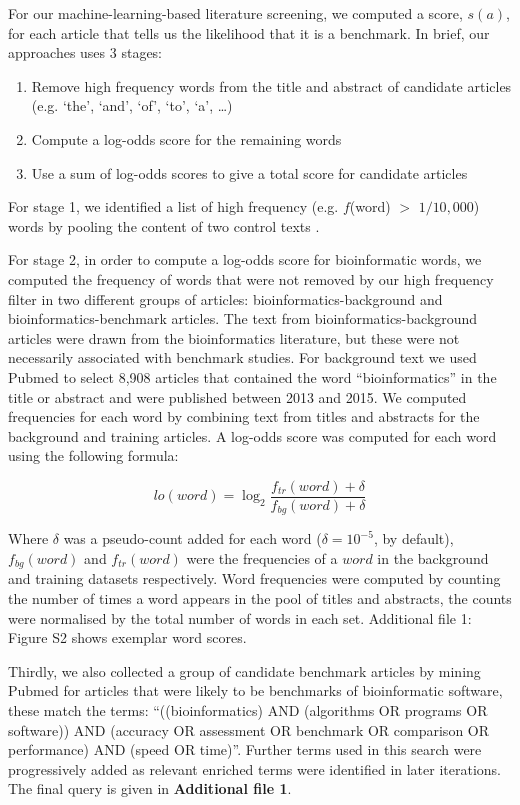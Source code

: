 \documentclass{bmcart}
\begin{document}
For our machine-learning-based literature screening, we computed a
score, $s(a)$, for each article that tells us the likelihood that it
is a benchmark. In brief, our approaches uses 3 stages:
\begin{enumerate}
\item Remove high frequency words from the title and abstract of candidate articles (e.g. ‘the’, ‘and’, ‘of’, ‘to’, ‘a’, …) 
\item Compute a log-odds score for the remaining words 
\item Use a sum of log-odds scores to give a total score for candidate articles
\end{enumerate}
For stage 1, we identified a list of high frequency (e.g. $f$(word) $>$
$1/10,000$) words by pooling the content of two control texts
\cite{Carroll1865-hk,Tolkien1937-ke}.

For stage 2, in order to compute a log-odds score for bioinformatic
words, we computed the frequency of words that were not removed by our
high frequency filter in two different groups of articles:
bioinformatics-background and bioinformatics-benchmark articles. The
text from bioinformatics-background articles were drawn from the
bioinformatics literature, but these were not necessarily associated
with benchmark studies. For background text we used Pubmed
\cite{Sayers2010-vm,McEntyre2001-fl} to select 8,908 articles that
contained the word “bioinformatics” in the title or abstract and were
published between 2013 and 2015. We computed frequencies for each word
by combining text from titles and abstracts for the background and
training articles. A log-odds score was computed for each word using
the following formula:

\[lo(word)=\log_2\frac{f_{tr}(word)+\delta}{f_{bg}(word)+\delta}\] 

Where
$\delta$
was a pseudo-count added for each word ($\delta = 10^{-5}$, by default),
$f_{bg}(word)$ and $f_{tr}(word)$ were the frequencies of a $word$ in
the background and training datasets respectively. Word frequencies
were computed by counting the number of times a word appears in the
pool of titles and abstracts, the counts were normalised by the total
number of words in each set. {\color{red}Additional file 1: Figure S2 shows exemplar word scores. }

Thirdly, we also collected a group of candidate benchmark articles by
mining Pubmed for articles that were likely to be benchmarks of
bioinformatic software, these match the terms: “((bioinformatics)
AND (algorithms OR programs OR software)) AND (accuracy OR assessment
OR benchmark OR comparison OR performance) AND (speed OR
time)”. Further terms used in this search were progressively added as
relevant enriched terms were identified in later iterations. The final
query is given in {\color{red} \textbf{Additional file 1}}.
\end{document}
